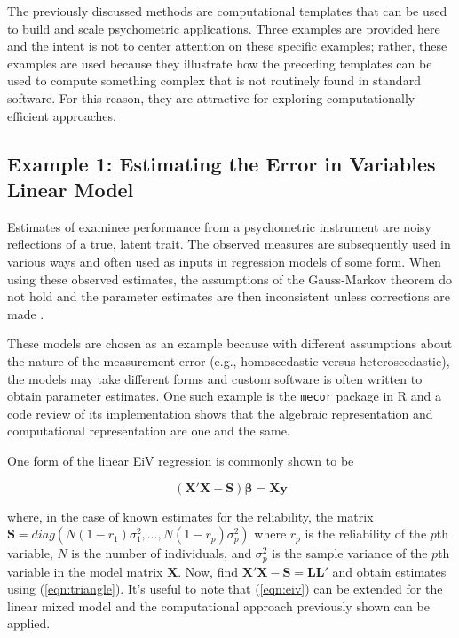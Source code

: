 \documentclass[12pt]{article}
\begin{document}
The previously discussed methods are computational templates that can be used to build and scale psychometric applications. Three examples are provided here and the intent is not to center attention on these specific examples; rather, these examples are used because they illustrate how the preceding templates can be used to compute something complex that is not routinely found in standard software. For this reason, they are attractive for exploring computationally efficient approaches. 

\subsection*{Example 1: Estimating the Error in Variables Linear Model}

Estimates of examinee performance from a psychometric instrument are noisy reflections of a true, latent trait. The observed measures are subsequently used in various ways and often used as inputs in regression models of some form. When using these observed estimates, the assumptions of the Gauss-Markov theorem do not hold and the parameter estimates are then inconsistent unless corrections are made \cite{doran:eiv,lockwood:eiv,nab}.   

These models are chosen as an example because with different assumptions about the nature of the measurement error (e.g., homoscedastic versus heteroscedastic), the models may take different forms and custom software is often written to obtain parameter estimates. One such example is the \texttt{mecor} \cite{nab} package in R and a code review of its implementation shows that the algebraic representation and computational representation are one and the same. 

One form of the linear EiV regression is commonly shown to be \cite{stata:eiv}

\begin{equation}
\label{eqn:eiv}
(\bm{X}'\bm{X} - \bm{S})\bm{\beta} = \bm{X}\bm{y} 
\end{equation}

\noindent where, in the case of known estimates for the reliability, the matrix $\bm{S} = diag(N(1-r_1)\sigma^2_1, \ldots, N(1-r_p)\sigma^2_p) $ where $r_p$ is the reliability of the $p$th variable, $N$ is the number of individuals, and $\sigma^2_p$ is the sample variance of the $p$th variable in the model matrix $\bm{X}$.  Now, find $\bm{X}'\bm{X} - \bm{S} = \bm{L}\bm{L}'$ and obtain estimates using (\ref{eqn:triangle}). It's useful to note that (\ref{eqn:eiv}) can be extended for the linear mixed model and the computational approach previously shown can be applied. 
\end{document}
